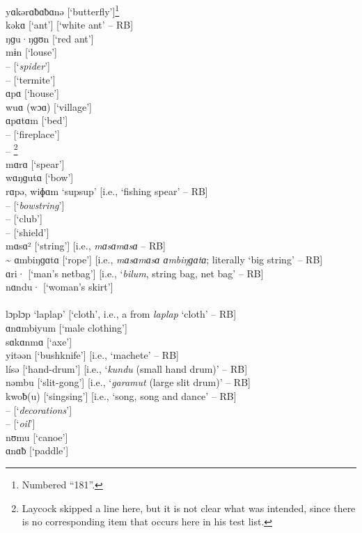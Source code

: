 \noindent yɑkərɑƀɑƀɑnə  [‘butterfly’]\footnote{Numbered “181”.}\\
kəkɑ       [‘ant’] [‘white ant’ -- RB]\\
ŋɡu·ŋɡʊn     [‘red ant’]\\
mɨn       [‘louse’]\\
 --        [‘\textit{spider}’]\\
 --        [‘termite’]\\
ɑpɑ       [‘house’]\\
wuɑ (wɔɑ)   [‘village’]\\
ɑpɑtɑm    [‘bed’]\\
 --        [‘fireplace’]\\
 -- \footnote{Laycock skipped a line here, but it is not clear what was intended, since there is no corresponding item that occurs here in his test list.}\\
mɑrɑ       [‘spear’]\\
wɑŋɡutɑ     [‘bow’]\\
rɑpə, wiɸɑm  ‘supsup’ [i.e., ‘fishing spear’ -- RB]\\
 --         [‘\textit{bowstring}’]\\
 --        [‘club’]\\
 --        [‘shield’]\\
mɑsɑ²       [‘string’] [i.e., \textit{mɑsɑmɑsɑ} -- RB]\\
{\textasciitilde} ɑmbiŋɡɑtɑ   [‘rope’] [i.e., \textit{mɑsɑmɑsɑ ɑmbiŋɡɑtɑ}; literally ‘big string’ -- RB]\\
ɑri·       [‘man’s netbag’] [i.e., ‘\textit{bilum}, string bag, net bag’ -- RB]\\
nɑndu·     [‘woman’s skirt’]\\

\\

\noindent lɔplɔp      ‘laplap’ [‘cloth’, i.e., a  from  \textit{laplap} ‘cloth’ -- RB]\\
ɑnɑmbiyum  [‘male clothing’]\\
sɑkɑnmɑ    [‘axe’]\\
yitəən      [‘bushknife’] [i.e., ‘machete’ -- RB]\\
lísə        [‘hand-drum’] [i.e., ‘\textit{kundu} (small hand drum)’ -- RB]\\
nəmbu      [‘slit-gong’] [i.e., ‘\textit{garamut} (large slit drum)’ -- RB]\\
kwoƀ(u)     [‘singsing’] [i.e., ‘song, song and dance’ -- RB]\\
 --        [‘\textit{decorations}’]\\
 --        [‘\textit{oil}’]\\
nʊmu       [‘canoe’]\\
ɑnɑƀ       [‘paddle’]\\


